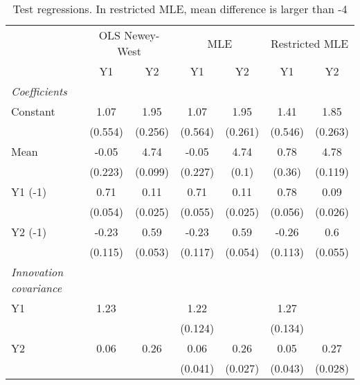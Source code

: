 \begin{table}[htbp] 
	\centering 
	\begin{tabular}{@{\extracolsep{4pt}}lcccccc@{}}		\hline\hline
		 		 & \multicolumn{2}{c}{OLS Newey-West} &\multicolumn{2}{c}{MLE} &\multicolumn{2}{c}{Restricted MLE} \\ 
 		 & Y1 	 & Y2 	 & Y1 	 & Y2 	 & Y1 	 & Y2\\\cline{2-3}\cline{4-5}\cline{6-7}
\rule{0pt}{4ex} 
 \emph{Coefficients} 	  		 & 		 & 		 & 		 & 		 & 		 &\\ 
\quad Constant 	 & 1.07 	 & 1.95 	 & 1.07 	 & 1.95 	 & 1.41 	 & 1.85	 \\ 
 		 & (0.554) 	 & (0.256) 	 & (0.564) 	 & (0.261) 	 & (0.546) 	 & (0.263) 	 \\ 
\quad Mean 	 & -0.05 	 & 4.74 	 & -0.05 	 & 4.74 	 & 0.78 	 & 4.78	 \\ 
 		 & (0.223) 	 & (0.099) 	 & (0.227) 	 & (0.1) 	 & (0.36) 	 & (0.119) 	 \\ 
\quad Y1 (-1) 	 &0.71 	 & 0.11 	 & 0.71 	 & 0.11 	 & 0.78 	 & 0.09	 \\ 
 		 & (0.054) 	 & (0.025) 	 & (0.055) 	 & (0.025) 	 & (0.056) 	 & (0.026) 	 \\ 
\quad Y2 (-1) 	 &-0.23 	 & 0.59 	 & -0.23 	 & 0.59 	 & -0.26 	 & 0.6	 \\ 
 		 & (0.115) 	 & (0.053) 	 & (0.117) 	 & (0.054) 	 & (0.113) 	 & (0.055) 	 \\ 
\rule{0pt}{4ex} \emph{Innovation covariance}  	 & 	 & 	 & 	 & 	 & 	 &\\ 
\quad Y1 	 &1.23 	 &  	 & 1.22 	 &  	 & 1.27 	 & 	 \\ 
 		 &  	 &  	 & (0.124) 	 &  	 & (0.134) 	 &  	 \\ 
\quad Y2 	 &0.06 	 & 0.26 	 & 0.06 	 & 0.26 	 & 0.05 	 & 0.27	 \\ 
 		 &  	 &  	 & (0.041) 	 & (0.027) 	 & (0.043) 	 & (0.028) 	 \\ 

 \hline 	\end{tabular}		\caption{Test regressions. In restricted MLE, mean difference is
           larger than -4}

\end{table}